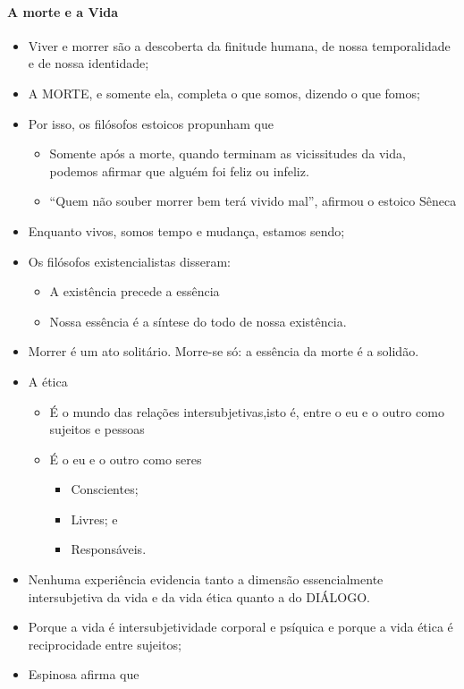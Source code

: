 \documentclass[
]{book}
\providecommand{\tightlist}{%
  \setlength{\itemsep}{0pt}\setlength{\parskip}{0pt}}
\begin{document}
\hypertarget{a-morte-e-a-vida}{%
\paragraph{A morte e a Vida}\label{a-morte-e-a-vida}}

\begin{itemize}
\tightlist
\item
  Viver e morrer são a descoberta da finitude humana, de nossa
  temporalidade e de nossa identidade;
\item
  A MORTE, e somente ela, completa o que somos, dizendo o que fomos;
\item
  Por isso, os filósofos estoicos propunham que

  \begin{itemize}
  \tightlist
  \item
    Somente após a morte, quando terminam as vicissitudes da vida,
    podemos afirmar que alguém foi feliz ou infeliz.
  \item
    ``Quem não souber morrer bem terá vivido mal'', afirmou o estoico
    Sêneca
  \end{itemize}
\item
  Enquanto vivos, somos tempo e mudança, estamos sendo;
\item
  Os filósofos existencialistas disseram:

  \begin{itemize}
  \tightlist
  \item
    A existência precede a essência
  \item
    Nossa essência é a síntese do todo de nossa existência.
  \end{itemize}
\item
  Morrer é um ato solitário. Morre-se só: a essência da morte é a
  solidão.
\item
  A ética

  \begin{itemize}
  \tightlist
  \item
    É o mundo das relações intersubjetivas,isto é, entre o eu e o outro
    como sujeitos e pessoas
  \item
    É o eu e o outro como seres

    \begin{itemize}
    \tightlist
    \item
      Conscientes;
    \item
      Livres; e
    \item
      Responsáveis.
    \end{itemize}
  \end{itemize}
\item
  Nenhuma experiência evidencia tanto a dimensão essencialmente
  intersubjetiva da vida e da vida ética quanto a do DIÁLOGO.
\item
  Porque a vida é intersubjetividade corporal e psíquica e porque a vida
  ética é reciprocidade entre sujeitos;
\item
  Espinosa afirma que


\end{itemize}
\end{document}
